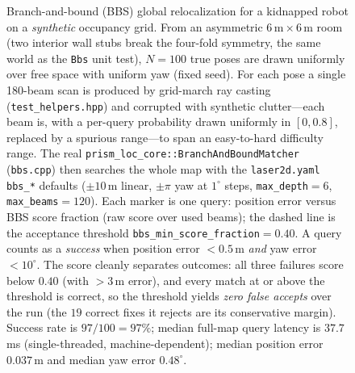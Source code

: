 \begin{figure}[t]
  \caption{Branch-and-bound (BBS) global relocalization for a kidnapped robot on a
    \emph{synthetic} occupancy grid. From an asymmetric $6\,\mathrm{m}\times6\,\mathrm{m}$
    room (two interior wall stubs break the four-fold symmetry, the same world as the
    \texttt{Bbs} unit test), $N=100$ true poses are drawn uniformly over free space with
    uniform yaw (fixed seed). For each pose a single 180-beam scan is produced by
    grid-march ray casting (\texttt{test\_helpers.hpp}) and corrupted with synthetic
    clutter---each beam is, with a per-query probability drawn uniformly in $[0,0.8]$,
    replaced by a spurious range---to span an easy-to-hard difficulty range. The real
    \texttt{prism\_loc\_core::BranchAndBoundMatcher} (\texttt{bbs.cpp}) then searches the
    whole map with the \texttt{laser2d.yaml} \texttt{bbs\_*} defaults
    ($\pm10\,$m linear, $\pm\pi$ yaw at $1^{\circ}$ steps, \texttt{max\_depth}$=6$,
    \texttt{max\_beams}$=120$). Each marker is one query: position error versus BBS score
    fraction (raw score over used beams); the dashed line is the acceptance threshold
    \texttt{bbs\_min\_score\_fraction}$=0.40$. A query counts as a \emph{success} when
    position error $<0.5\,$m \emph{and} yaw error $<10^{\circ}$. The score cleanly
    separates outcomes: all three failures score below $0.40$ (with $>3\,$m error), and
    every match at or above the threshold is correct, so the threshold yields
    \emph{zero false accepts} over the run (the $19$ correct fixes it rejects are its
    conservative margin). Success rate is $97/100=97\%$; median full-map query latency is
    $37.7\,$ms (single-threaded, machine-dependent); median position error $0.037\,$m and
    median yaw error $0.48^{\circ}$.}
  \label{fig:bbs}
\end{figure}
